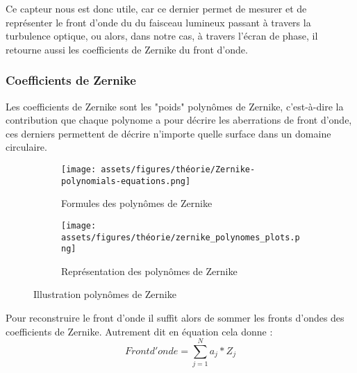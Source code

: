 Ce capteur nous est donc utile, car ce dernier permet de mesurer et de représenter le front d'onde du du faisceau lumineux passant à travers la turbulence
optique, ou alors, dans notre cas, à travers l'écran de phase, il retourne aussi les coefficients de Zernike du front d'onde.

\newpage
\subsubsection{Coefficients de Zernike}

Les coefficients de Zernike sont les "poids" polynômes de Zernike, c'est-à-dire la contribution que chaque polynome a pour décrire les aberrations de front d'onde,
ces derniers permettent de décrire n'importe quelle surface dans un domaine circulaire.
\begin{figure}[H]
  \centering
  \begin{subfigure}{.5\textwidth}
    \centering
    \texttt{[image: assets/figures/théorie/Zernike-polynomials-equations.png]}
    \caption{Formules des polynômes de Zernike}
    \label{fig:formules_poly_Zernike}
  \end{subfigure}%
  \begin{subfigure}{.5\textwidth}
    \centering
    \texttt{[image: assets/figures/théorie/zernike\_polynomes\_plots.png]}
    \caption{Représentation des polynômes de Zernike}
    \label{fig:plots_des_polynomes_Zernike}
  \end{subfigure}
  \caption[Illustration polynômes de Zernike]{Illustration polynômes de Zernike \cite{Zernike_docteur_Damien}\footnotemark}
  \label{fig:illu_poly_Zernike}
\end{figure}


Pour reconstruire le front d'onde il suffit alors de sommer les fronts d'ondes des coefficients de Zernike. Autrement dit en équation cela donne :
\begin{equation}
  Front d'onde = \sum_{j=1}^{N}a_j * Z_j
\end{equation}